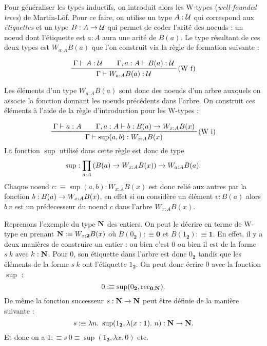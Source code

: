 \documentclass[../../rapport.tex]{subfiles}
\begin{document}
  Pour généraliser les types inductifs, on introduit alors les W-types (\textit{well-founded trees}) de Martin-Löf.
  Pour ce faire, on utilise un type $A : \mathcal U$ qui correspond aux \textit{étiquettes} et un type $B : A \rightarrow \mathcal U$ qui
  permet de coder l'arité des noeuds : un noeud dont l'étiquette est $a : A$ aura une arité de $B(a)$.
  Le type résultant de ces deux types est $W_{a:A} B(a)$ que l'on construit via la règle de formation suivante :

  $$
  \prfinterspace=2em
  \prftree[r]{(W f)}{\Gamma \vdash A : \U}{\Gamma, a : A \vdash B(a) : \U}{\Gamma \vdash W_{a: A} B(a) : \U}
  $$

  Les éléments d'un type $W_{a:A}B(a)$ sont donc des noeuds d'un arbre auxquels on associe la fonction donnant
  les noeuds précédents dans l'arbre. On construit ces éléments à l'aide
  de la règle d'introduction pour les W-types :

  $$
  \prfinterspace=2em
  \prftree[r]{(W i)}{\Gamma \vdash a : A}{\Gamma, a : A \vdash b : B(a) \fun W_{x:A}B(x)}
    {\Gamma \vdash \sup(a, b) : W_{x:A}B(x)}
  $$
  La fonction $\sup$ utilisé dans cette règle est donc de type
  $$\sup : \prod_{a:A}{\left(B(a) \rightarrow W_{x:A}B(x)\right)} \rightarrow W_{a:A}B(a).$$
  Chaque noeud $c :\equiv \sup(a, b) : W_{x:A}B(x)$ est donc relié aux autres par la fonction $b : B(a) \rightarrow W_{x:A}B(x)$,
  en effet si on considère un élément $v : B(a)$ alors $b\ v$ est un prédecesseur du noeud $c$ dans l'arbre $W_{x:A}B(x)$.

  \begin{figure}[ht]
    \centering
  \end{figure}

  Reprenons l'exemple du type $\mathbf N$ des entiers.
  On peut le décrire en terme de W-type en prenant $\mathbf N :\equiv W_{x: \textbf{2}}B(x)$ où $B(0_{\textbf{2}}) :\equiv \textbf{0}$
  et $B(1_{\textbf{2}}) :\equiv \textbf{1}$.
  En effet, il y a deux manières de construire un entier : ou bien c'est 0 ou bien il est de la forme $s\ k$ avec $k : \mathbf N$.
  Pour 0, son étiquette dans l'arbre est donc $0_{\textbf{2}}$ tandis que les éléments de la forme $s\ k$ ont l'étiquette
  $1_{\textbf{2}}$.
  On peut donc écrire 0 avec la fonction $\sup$ :
  $$ 0 :\equiv \sup(0_{\textbf{2}}, \operatorname{rec}_{\textbf{0}, \mathbf N}).$$
  De même la fonction successeur $s : \mathbf N \rightarrow \mathbf N$ peut être définie de la manière suivante :
  $$ s :\equiv \lambda n.\ \sup(1_{\textbf{2}}, \lambda(x : \textbf{1}).\ n) : \N \fun \N.$$
  Et donc on a $1 :\equiv s\ 0 \equiv \sup(1_{\textbf{2}}, \lambda x.\ 0)$ etc.
\end{document}

